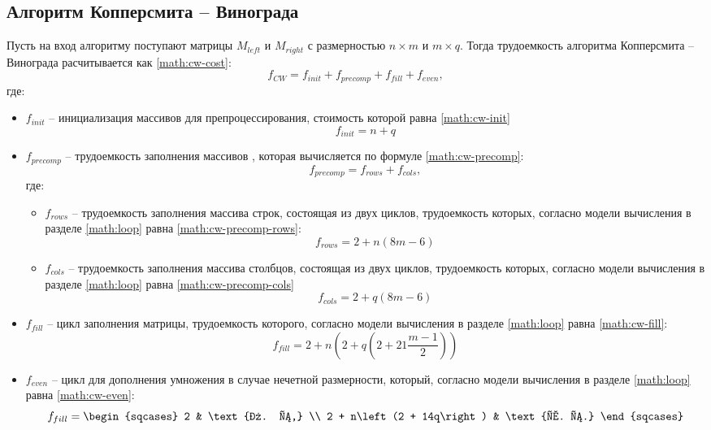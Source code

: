 \subsection{Алгоритм Копперсмита -- Винограда}\label{win-estimate}
Пусть на вход алгоритму поступают матрицы $M_{left}$ и $M_{right}$ с размерностью $n \times m$ и $m \times q$. Тогда трудоемкость алгоритма Копперсмита -- Винограда расчитывается как \ref{math:cw-cost}:
\begin{equation}\label{math:cw-cost}
	f_{CW} = f_{init} + f_{precomp} + f_{fill} + f_{even},
\end{equation}
где:
\begin{itemize}
	\item $f_{init}$ -- инициализация массивов для препроцессирования, стоимость которой равна \ref{math:cw-init}
	\begin{equation}\label{math:cw-init}
		f_{init} = n + q
	\end{equation} 
	\item $f_{precomp}$ -- трудоемкость заполнения массивов , которая вычисляется по формуле \ref{math:cw-precomp}:
	\begin{equation}\label{math:cw-precomp}
		f_{precomp} = f_{rows} + f_{cols},
	\end{equation} 
	где:
	\begin{itemize}
		\item $f_{rows}$ -- трудоемкость заполнения массива строк, состоящая из двух циклов, трудоемкость которых, согласно модели вычисления в разделе \ref{math:loop} равна \ref{math:cw-precomp-rows}:
		\begin{equation}\label{math:cw-precomp-rows}
			f_{rows} = 2 + n\left(8m - 6\right)
		\end{equation}
		\item $f_{cols}$ -- трудоемкость заполнения массива столбцов, состоящая из двух циклов, трудоемкость которых, согласно модели вычисления в разделе \ref{math:loop} равна \ref{math:cw-precomp-cols}
		\begin{equation}\label{math:cw-precomp-cols}
			f_{cols} = 2 + q\left(8m - 6\right)
		\end{equation}
	\end{itemize}
	\item $f_{fill}$ -- цикл заполнения матрицы, трудоемкость которого, согласно модели вычисления в разделе \ref{math:loop} равна \ref{math:cw-fill}:
	\begin{equation}\label{math:cw-fill}
		f_{fill} = 2 + n\left(2 + q\left(2 + 21\dfrac{m - 1}{2}\right)\right)
	\end{equation}
	\item $f_{even}$ -- цикл для дополнения умножения в случае нечетной размерности, который, согласно модели вычисления в разделе \ref{math:loop} равна \ref{math:cw-even}:
	\begin{equation}\label{math:cw-even}
		f_{fill} = 
		\begin{sqcases}
			2 & \text{л. с,} \\ 
			2 + n\left(2 + 14q\right) & \text{х. с.}
		\end{sqcases}
	\end{equation}
\end{itemize}
